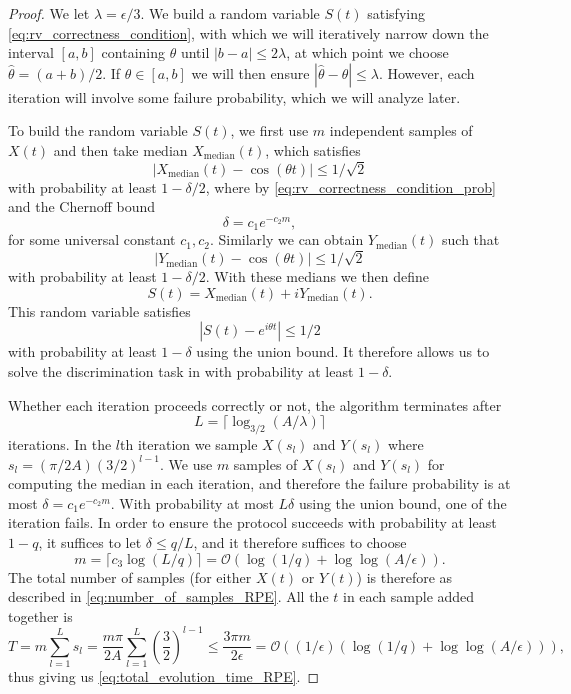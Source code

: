 \documentclass[twocolumn,superscriptaddress,aps,showpacs,amsmath,amstex,amssymb,citeautoscript,floatfix,pra,preprintnumbers]{revtex4-2}
\newcounter{alg}
\theoremstyle{plain}
\theoremstyle{plain}
\theoremstyle{plain}
\theoremstyle{plain}
\theoremstyle{plain}
\theoremstyle{plain}
\begin{document}
\begin{appendix}
\begin{proof}
    We let $\lambda=\epsilon/3$.
    We build a random variable $S(t)$ satisfying \eqref{eq:rv_correctness_condition}, with which we will iteratively narrow down the interval $[a,b]$ containing $\theta$ until $|b-a|\leq 2\lambda$, at which point we choose $\hat{\theta}=(a+b)/2$. If $\theta\in[a,b]$ we will then ensure $|\hat{\theta}-\theta|\leq \lambda$. However, each iteration will involve some failure probability, which we will analyze later.

    To build the random variable $S(t)$, we first use $m$ independent samples of $X(t)$ and then take median $X_{\mathrm{median}}(t)$, which satisfies 
    \[
    |X_{\mathrm{median}}(t)-\cos(\theta t)|\leq 1/\sqrt{2}
    \]
    with probability at least $1-\delta/2$, where by \eqref{eq:rv_correctness_condition_prob} and the Chernoff bound 
    \[
    \delta = c_1 e^{-c_2 m},
    \]
    for some universal constant $c_1,c_2$.
    Similarly we can obtain $Y_{\mathrm{median}}(t)$ such that
    \[
    |Y_{\mathrm{median}}(t)-\cos(\theta t)|\leq 1/\sqrt{2}
    \]
    with probability at least $1-\delta/2$. With these medians we then define
    \[
    S(t) = X_{\mathrm{median}}(t) + iY_{\mathrm{median}}(t).
    \]
    This random variable satisfies
    \[
    |S(t)-e^{i\theta t}|\leq 1/2
    \]
    with probability at least $1-\delta$ using the union bound. It therefore allows us to solve the discrimination task in  with probability at least $1-\delta$.

    Whether each iteration proceeds correctly or not, the algorithm terminates after 
    \[
    L=\lceil \log_{3/2}(A/\lambda) \rceil
    \]
    iterations. In the $l$th iteration we sample $X(s_l)$ and $Y(s_l)$ where $s_l=(\pi/2A)(3/2)^{l-1}$. 
    We use $m$ samples of $X(s_l)$ and $Y(s_l)$ for computing the median in each iteration, and therefore the failure probability is at most $\delta=c_1 e^{-c_2 m}$. 
    With probability at most $L\delta$ using the union bound, one of the iteration fails. 
    In order to ensure the protocol succeeds with probability at least $1-q$, it suffices to let $\delta \leq q/L$, and it therefore suffices to choose
    \[
    m = \lceil c_3 \log(L/q) \rceil=\mathcal{O}(\log(1/q)+\log\log(A/\epsilon)).
    \]
    The total number of samples (for either $X(t)$ or $Y(t)$) is therefore as described in \eqref{eq:number_of_samples_RPE}.
    All the $t$ in each sample added together is
    \begin{equation}
        \label{eq:total_time}
        T = m\sum_{l=1}^{L}  s_l = \frac{m\pi}{2A}\sum_{l=1}^L \left(\frac{3}{2}\right)^{l-1} \leq \frac{3\pi m}{2\epsilon}=\mathcal{O}((1/\epsilon)(\log(1/q)+\log\log(A/\epsilon))),
    \end{equation} 
    thus giving us \eqref{eq:total_evolution_time_RPE}.
\end{proof}


\end{appendix}
\end{document}

